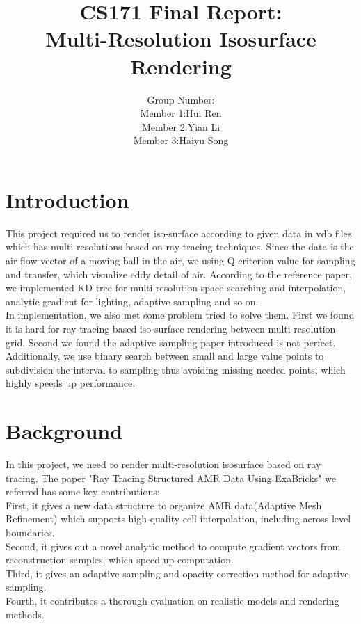 \documentclass[acmtog]{acmart}
\title{CS171 Final Report:\\ {Multi-Resolution Isosurface Rendering}}
\author{
	Group Number:\quad 1 \\
	Member 1:\quad Hui Ren\\
	Member 2:\quad Yian Li\\
	Member 3:\quad Haiyu Song
}
\begin{document}
\maketitle


\vspace*{2 ex}


\section{Introduction}


This project required us to render iso-surface according to given data in vdb files which has multi resolutions based on ray-tracing techniques. Since the data is the air flow vector of a moving ball in the air, we using Q-criterion value for sampling and transfer, which visualize eddy detail of air. According to the reference paper, we implemented KD-tree for multi-resolution space searching and interpolation, analytic gradient for lighting, adaptive sampling and so on. \\
In implementation, we also met some problem tried to solve them. First we found it is hard for ray-tracing based iso-surface rendering between multi-resolution grid. Second we found the adaptive sampling paper introduced is not perfect. Additionally, we use binary search between small and large value points to subdivision the interval to sampling thus avoiding missing needed points, which highly speeds up performance.


\section{Background}


In this project, we need to render multi-resolution isosurface based on ray tracing. The paper "Ray Tracing Structured AMR Data Using ExaBricks"  we referred has some key contributions: \\
First, it gives a new data structure to organize AMR data(Adaptive Mesh Refinement) which supports high-quality cell interpolation, including across level boundaries. \\
Second, it gives out a novel analytic method to compute gradient vectors from reconstruction samples, which speed up computation.  \\
Third, it gives an adaptive sampling and opacity correction method for adaptive sampling.\\
Fourth, it contributes a thorough evaluation on realistic models and rendering methods.
\end{document}
